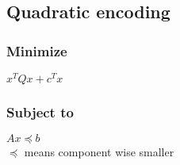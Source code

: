 \subsection{Quadratic encoding}
\subsubsection{Minimize}
$x^{T}Qx + c^{T}x$
\subsubsection{Subject to}
$Ax \preceq b$\\ $\preceq$ means component wise smaller
